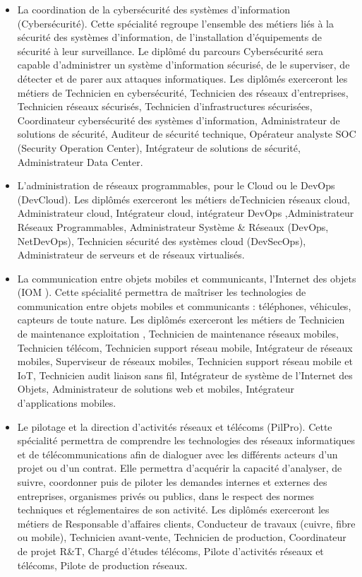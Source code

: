 \medskip
\begin{itemize}[leftmargin=5ex]
	\item La coordination de la cybersécurité des systèmes d'information (Cybersécurité). Cette spécialité regroupe l'ensemble des métiers liés à la sécurité des systèmes d'information, de l'installation d'équipements de sécurité à leur surveillance. Le diplômé du parcours Cybersécurité sera capable d'administrer un système d'information sécurisé, de le superviser, de détecter et de parer aux attaques informatiques. Les diplômés exerceront les métiers de Technicien en cybersécurité, Technicien des réseaux d'entreprises, Technicien réseaux sécurisés, Technicien d'infrastructures sécurisées, Coordinateur cybersécurité des systèmes d'information, Administrateur de solutions de sécurité, Auditeur de sécurité technique, Opérateur analyste SOC (Security Operation Center), Intégrateur de solutions de sécurité, Administrateur Data Center.
	\item L'administration de réseaux programmables, pour le Cloud ou le DevOps (DevCloud). Les diplômés exerceront les métiers  deTechnicien réseaux cloud, Administrateur cloud, Intégrateur cloud, intégrateur DevOps ,Administrateur Réseaux Programmables, Administrateur Système \& Réseaux (DevOps, NetDevOps), Technicien sécurité des systèmes cloud (DevSecOps), Administrateur de serveurs et de réseaux virtualisés.
	
	\item La communication entre objets mobiles et communicants, l'Internet des objets (IOM ). Cette spécialité permettra de maîtriser les technologies de communication entre objets mobiles et communicants : téléphones, véhicules, capteurs de toute nature. Les diplômés exerceront les métiers de Technicien de maintenance exploitation , Technicien de maintenance réseaux mobiles, Technicien télécom, Technicien support réseau mobile, Intégrateur de réseaux mobiles, Superviseur de réseaux mobiles, Technicien support réseau mobile et IoT, Technicien audit liaison sans fil, Intégrateur de système de l’Internet des Objets, Administrateur de solutions web et mobiles, Intégrateur d’applications mobiles.
	
	\item Le pilotage et la direction d'activités réseaux et télécoms (PilPro). Cette spécialité permettra de comprendre les technologies des réseaux informatiques et de télécommunications afin de dialoguer avec les différents acteurs d’un projet ou d’un contrat. Elle permettra d’acquérir la capacité d’analyser, de suivre, coordonner puis de piloter les demandes internes et externes des entreprises, organismes privés ou publics, dans le respect des normes techniques et réglementaires de son activité. Les diplômés exerceront les métiers de Responsable d'affaires clients, Conducteur de travaux (cuivre, fibre ou mobile), Technicien avant-vente, Technicien de production, Coordinateur de projet R\&T, Chargé d’études télécoms, Pilote d’activités réseaux et télécoms, Pilote de production réseaux.
	

\end{itemize}
